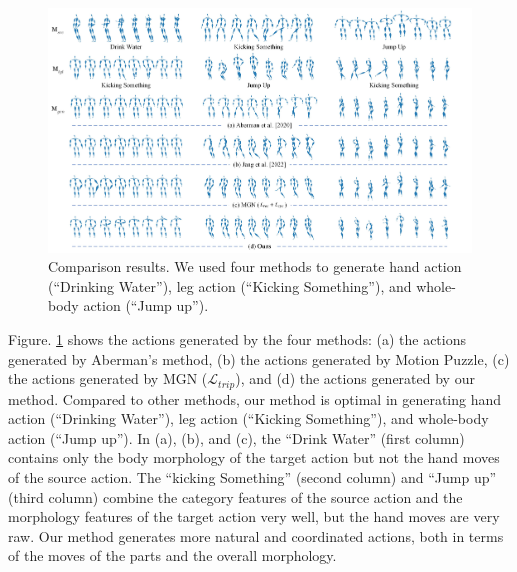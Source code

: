\begin{table}
  \centering
  \caption{FMD and Acc are measured using five methods: [Aberman et al. 2020], [Jang et al. 2022], MGN($\mathcal{L}_{rec}+\mathcal{L}_{cyc}$), MGN($\mathcal{L}_{rec}+\mathcal{L}_{cyc}+\mathcal{L}_{trip}$), and AGN.}
  \label{tab:3}
\end{table}

\begin{figure}[htpb]
  \centering
   \includegraphics[width=0.8\linewidth]{figures/Fig6.jpg}

   \caption{Comparison results. We used four methods to generate hand action (“Drinking Water”), leg action (“Kicking Something”), and whole-body action (“Jump up”).}
   \label{fig:6}
\end{figure}

Figure. \ref{fig:6} shows the actions generated by the four methods: (a) the actions generated by Aberman's method, (b) the actions generated by Motion Puzzle, (c) the actions generated by MGN ($\mathcal{L}_{trip}$), and (d) the actions generated by our method.  
Compared to other methods, our method is optimal in generating hand action (“Drinking Water”), leg action (“Kicking Something”), and whole-body action (“Jump up”). 
In (a), (b), and (c), the “Drink Water” (first column) contains only the body morphology of the target action but not the hand moves of the source action. 
The “kicking Something” (second column) and “Jump up” (third column) combine the category features of the source action and the morphology features of the target action very well, but the hand moves are very raw.
Our method generates more natural and coordinated actions, both in terms of the moves of the parts and the overall morphology.

